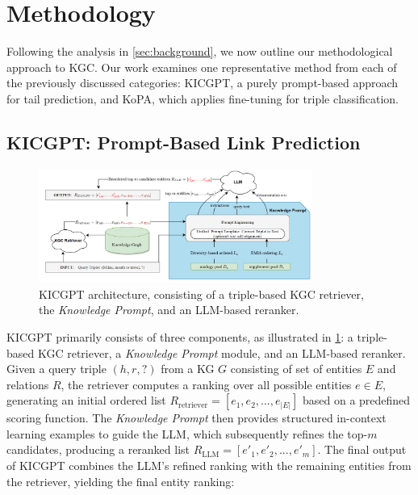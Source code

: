 \documentclass[12pt,a4paper]{article}
\begin{document}
%
%


\section{Methodology}\label{sec:methodology}

Following the analysis in \cref{sec:background}, we now outline our methodological approach to KGC. Our work examines one representative method from each of the previously discussed categories: KICGPT, a purely prompt-based approach for tail prediction, and KoPA, which applies fine-tuning for triple classification.


\subsection{KICGPT: Prompt-Based Link Prediction}
\label{sec:method:kicgpt}

\begin{figure}
    \centering
    \includegraphics[width=0.8\textwidth]{figures/KICGPTarchitecture}
    \caption{KICGPT architecture, consisting of a triple-based KGC retriever, the \emph{Knowledge Prompt}, and an LLM-based reranker.}
    \label{fig:KICGPTarchitecture}
\end{figure}

KICGPT primarily consists of three components, as illustrated in \cref{fig:KICGPTarchitecture}: a triple-based KGC retriever, a \emph{Knowledge Prompt} module, and an LLM-based reranker.
Given a query triple \( (h, r, ?) \) from a KG \(G\) consisting of set of entities \(E\) and relations \(R\), the retriever computes a ranking over all possible entities \( e \in E \), generating an initial ordered list \( R_{\text{retriever}} = [e_1, e_2, ..., e_{|E|}] \) based on a predefined scoring function. The \emph{Knowledge Prompt} then provides structured in-context learning examples to guide the LLM, which subsequently refines the top-\( m \) candidates, producing a reranked list \( R_{\text{LLM}} = [e'_1, e'_2, ..., e'_m] \).
The final output of KICGPT combines the LLM’s refined ranking with the remaining entities from the retriever, yielding the final entity ranking:
\end{document}
